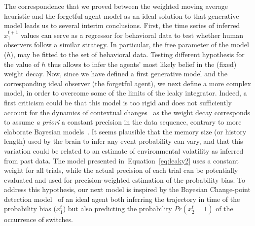 \documentclass[10pt,letterpaper]{article}
\newcommand{\citep}[1]{\cite{#1}}
\newcommand{\seeFig}[1]{Figure~\ref{fig:#1}}
\newcommand{\seeEq}[1]{Equation~\ref{eq:#1}}
\newcommand{\Rone}[1]{\textbf{\textcolor{magenta}{[rev 1: #1]}}}
\begin{document}
The correspondence that we proved between the weighted moving average heuristic
and the forgetful agent model as an ideal solution to that generative model leads
us to several interim conclusions.
First, the time series of inferred $\hat{x}_1^{t+1}$ values
can serve as a regressor for behavioral data
to test whether human observers follow a similar strategy.
In particular, the free parameter of the model ($h$),
may be fitted to the set of behavioral data.
Testing different hypothesis for the value of $h$ thus allows
to infer the agents' most likely belief in the (fixed) weight decay.
Now, since we have defined a first generative model
and the corresponding ideal observer (the forgetful agent),
we next define a more complex model,
in order to overcome some of the limits of the leaky integrator.
Indeed, a first criticism could be that
this model is too rigid and does not sufficiently
account for the dynamics of contextual changes~\citep{Behrens07}
as the weight decay corresponds to assume \emph{a priori} a constant precision in the data sequence, contrary to more elaborate Bayesian models~\citep{Vilares2011}.
It seems plausible that the memory size (or history length) used by the brain
to infer any event probability can vary, and that this variation could be related
to an estimate of environmental volatility as inferred from past data.
The model presented in~\seeEq{leaky2} uses a constant weight
for all trials, while the actual precision of each trial
can be potentially evaluated and used
for precision-weighted estimation of the probability bias.
To address this hypothesis, our next model is inspired
by the Bayesian Change-point detection model~\citep{AdamsMackay2007}
of an ideal agent
both inferring the trajectory in time of the probability bias ($x_1^t$)
but also predicting the probability $Pr(x_2^t=1)$ of the occurrence of switches.
\end{document}

